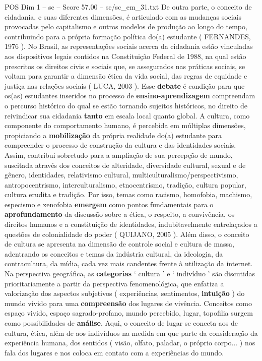 \begin{textsample}{POS Dim 1 – sc – Score 57.00 – sc/sc\_em\_31.txt}
De outra parte, o conceito de cidadania, e suas diferentes dimensões, é articulado com as mudanças sociais provocadas pelo capitalismo e outros modelos de produção ao longo do tempo, contribuindo para a própria formação política do(a) estudante ( FERNANDES, 1976 ).
No Brasil, as representações sociais acerca da cidadania estão vinculadas aos dispositivos legais contidos na Constituição Federal de 1988, na qual estão prescritos os direitos civis e sociais que, se assegurados nas práticas sociais, se voltam para garantir a dimensão ética da vida social, das regras de equidade e justiça nas relações sociais ( LUCA, 2003 ).
Esse \textbf{debate} é condição para que os(as) estudantes inseridos no processo de \textbf{ensino-aprendizagem} compreendam o percurso histórico do qual se estão tornando sujeitos históricos, no direito de reivindicar sua cidadania \textbf{tanto} em escala local quanto global.
A cultura, como componente do comportamento humano, é percebida em múltiplas dimensões, propiciando a \textbf{mobilização} da própria realidade do(a) estudante para compreender o processo de construção da cultura e das identidades sociais.
Assim, contribui sobretudo para a ampliação de sua percepção de mundo, suscitada através dos conceitos de alteridade, diversidade cultural, sexual e de gênero, identidades, relativismo cultural, multiculturalismo/perspectivismo, antropocentrismo, interculturalismo, etnocentrismo, tradição, cultura popular, cultura erudita e tradição.
Por isso, temas como racismo, homofobia, machismo, especismo e xenofobia \textbf{emergem} como pontos fundamentais para o \textbf{aprofundamento} da discussão sobre a ética, o respeito, a convivência, os direitos humanos e a constituição de identidades, indubitavelmente entrelaçados a questões de colonialidade do poder ( QUIJANO, 2005 ).
Além disso, o conceito de cultura se apresenta na dimensão de controle social e cultura de massa, adentrando os conceitos e temas da indústria cultural, da ideologia, da contracultura, da mídia, cada vez mais candentes frente à utilização da internet.
Na perspectiva geográfica, as \textbf{categorias} ‘ cultura ’ e ‘ indivíduo ’ são discutidas prioritariamente a partir da perspectiva fenomenológica, que enfatiza a valorização dos aspectos subjetivos ( experiências, sentimentos, \textbf{intuição} ) do mundo vivido para uma \textbf{compreensão} dos lugares de vivência.
Conceitos como espaço vivido, espaço sagrado-profano, mundo percebido, lugar, topofilia surgem como possibilidades de \textbf{análise}.
Aqui, o conceito de lugar se conecta aos de cultura, ética, além de aos indivíduos na medida em que parte da consideração da experiência humana, dos sentidos ( visão, olfato, paladar, o próprio corpo... ) nos fala dos lugares e nos coloca em contato com a experiências do mundo.

\end{textsample}
